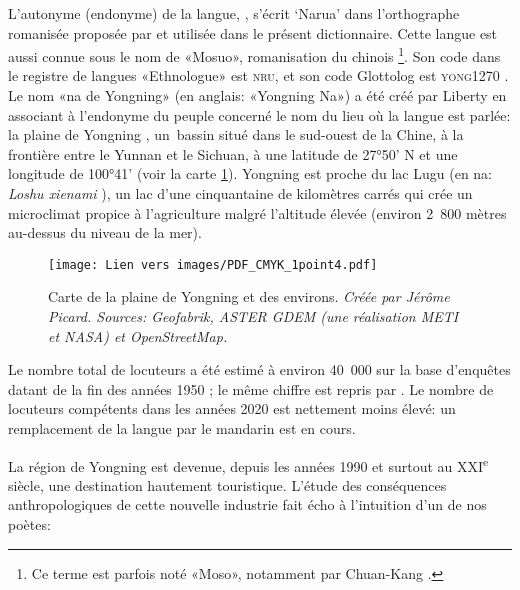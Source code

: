 L'autonyme (endonyme) de la langue, , s'écrit ‘Narua’ dans l'orthographe romanisée proposée par \textcite{dobbs_ortho_2018} et utilisée dans le présent dictionnaire. Cette langue est aussi connue sous le nom de «Mosuo», romanisation du chinois \footnote{Ce terme est parfois noté «Moso», notamment par Chuan-Kang \cite[][]{shih1993,shih2010}.}. Son code dans le registre de langues «Ethnologue»  \parencite{lewisetal2016} est \textsc{nru},
et son code Glottolog est \textsc{yong1270} \parencite{Nordhoff2012}. %
Le nom «na de Yongning» (en anglais: «Yongning Na») a été créé par Liberty \textcite{lidz2006} en associant à l'endonyme du peuple concerné le nom du lieu où la langue est parlée: la plaine de Yongning , un~bassin situé dans le sud-ouest de la Chine, à la frontière entre le Yunnan et le Sichuan, à une latitude de 27°50' N et une longitude de 100°41' (voir la carte \ref{map:1-1}). Yongning est proche du lac Lugu  (en na: \emph{Loshu xienami} ), un lac d'une cinquantaine de kilomètres carrés qui crée un microclimat propice à l'agriculture malgré l'altitude élevée (environ 2~800 mètres au-dessus du niveau de la mer).

\begin{figure}
	\centering
	\caption{Carte de la plaine de Yongning et des environs. \emph{Créée par Jérôme Picard. Sources: Geofabrik, ASTER GDEM (une réalisation METI et NASA) et OpenStreetMap.}}
	\texttt{[image: Lien vers images/PDF\_CMYK\_1point4.pdf]}
	\label{map:1-1}
\end{figure}

Le nombre total de locuteurs a été estimé à environ 40~000 sur la base d'enquêtes datant de la fin des années 1950 \parencite[107]{heetal1985}; le même chiffre est repris par \textcite{yang2009}. Le nombre de locuteurs compétents dans les années 2020 est nettement moins élevé: un remplacement de la langue par le mandarin est en cours.

La région de Yongning est devenue, depuis les années 1990 et surtout au XXI\textsuperscript{e} siècle, une destination hautement touristique. L'étude des conséquences anthropologiques de cette nouvelle industrie \parencite{milan_tourisme_2019} fait écho à l'intuition d'un de nos poètes:

